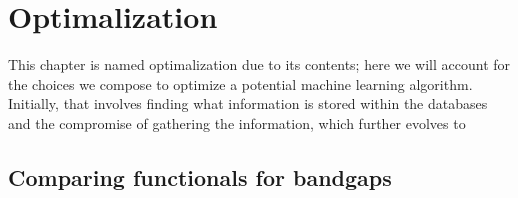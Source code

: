 \chapter{Optimalization}

This chapter is named optimalization due to its contents; here we will account for the choices we compose to optimize a potential machine learning algorithm. Initially, that involves finding what information is stored within the databases and the compromise of gathering the information, which further evolves to

\begin{comment}
\section{Time of extraction and featurization}

The initial thought behind

\begin{table}[!ht]
\centering
\caption{}
\label{tab:timing-extraction}
\noindent\makebox[\textwidth]{
\begin{tabular}{M{3.0cm} M{4.0cm} M{4.0cm}}
  \hline
  \hline
  Database & Extraction period & Estimated time usage  \\
  \hline
  Materials Project & December $2020$ & $5$ min \\
  Citrine Informatics & December $2020$ & $2$ min  \\
  OQMD & December $2020$ & $3$ min \\
  AFLOW & January $2020$ - February $2021$ & $17$ days \\
  AFLOW-ML & January $2020$ - February $2021$ & $16$ days \\
  JARVIS-DFT & January $2020$ & $5$ min \\
  \hline
  \hline
\end{tabular}
}
\end{table}

\end{comment}


\section{Comparing functionals for bandgaps}


